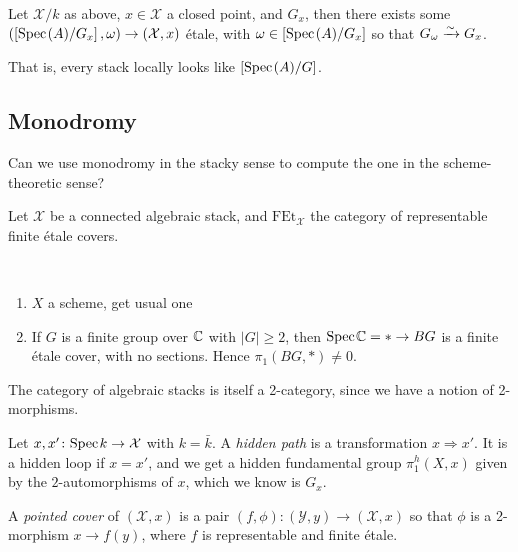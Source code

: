 \documentclass[11pt]{amsart}
\providecommand{\FEt}{\mathrm{FEt}}
\begin{document}
\begin{theorem} Let $\mathcal{X}/k$ as above, $x\in \mathcal{X}$ a closed point, and $G_x$, then there exists some $\left( \left[ \text{Spec}\hspace{0.1em}(A)/G_x \right],\omega \right) \to (\mathcal{X},x)$ \'etale, with $\omega \in \left[ \text{Spec}\hspace{0.1em}(A)/G_x \right]$ so that $G_\omega \xrightarrow{\sim} G_x$.
\end{theorem}

That is, every stack locally looks like $\left[ \text{Spec}\hspace{0.1em}(A)/G \right]$.

\subsection{Monodromy}

Can we use monodromy in the stacky sense to compute the one in the scheme-theoretic sense?

Let $\mathcal{X}$ be a connected algebraic stack, and $\FEt_{\mathcal{X}}$ the category of representable finite \'etale covers.

\begin{example} \,
\begin{enumerate}
    \item $X$ a scheme, get usual one
    \item If $G$ is a finite group over $\mathbb{C}$ with $|G|\ge 2$, then $\text{Spec}\hspace{0.1em} \mathbb{C} = \ast \to BG$ is a finite \'etale cover, with no sections. Hence $\pi_1(BG,\ast) \ne 0$.
\end{enumerate}
\end{example}

\begin{remark} The category of algebraic stacks is itself a 2-category, since we have a notion of 2-morphisms.
\end{remark}

\begin{definition} Let $x,x' \colon \text{Spec}\hspace{0.1em} k \to \mathcal{X}$ with $k=\bar{k}$. A \textit{hidden path} is a transformation $x \Rightarrow x'$. It is a hidden loop if $x=x'$, and we get a hidden fundamental group $\pi_1^h(X,x)$ given by the $2$-automorphisms of $x$, which we know is $G_x$.
\end{definition}

\begin{definition} A \textit{pointed cover} of $(\mathcal{X},x)$ is a pair $(f,\phi) \colon (\mathcal{Y},y) \to (\mathcal{X},x)$ so that $\phi$ is a 2-morphism $x \to f(y)$, where $f$ is representable and finite \'etale.
\end{definition}
\end{document}
